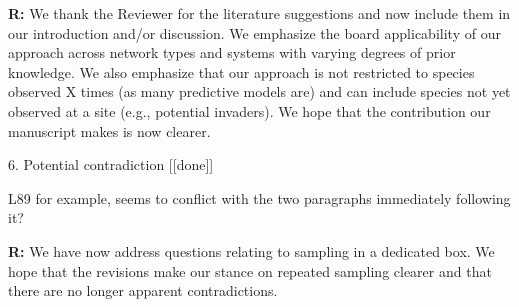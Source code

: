 \documentclass[12pt]{letter}
\newenvironment{refquote}{\bigskip \begin{it}}{\end{it}\smallskip}
\begin{document}
		\textbf{R:} We thank the Reviewer for the literature suggestions and now include them in our introduction and/or discussion. We emphasize the board applicability of our approach across network types and systems with varying degrees of prior knowledge. We also emphasize that our approach is not restricted to species observed X times (as many predictive models are) and can include species not yet observed at a site (e.g., potential invaders). We hope that the contribution our manuscript makes is now clearer.


	6. Potential contradiction [[done]]

		\begin{refquote}
		L89 for example, seems to conflict with the two paragraphs immediately following it?
		\end{refquote}


		\textbf{R:} We have now address questions relating to sampling in a dedicated box. We hope that the revisions make our stance on repeated sampling clearer and that there are no longer apparent contradictions.


\end{document}
